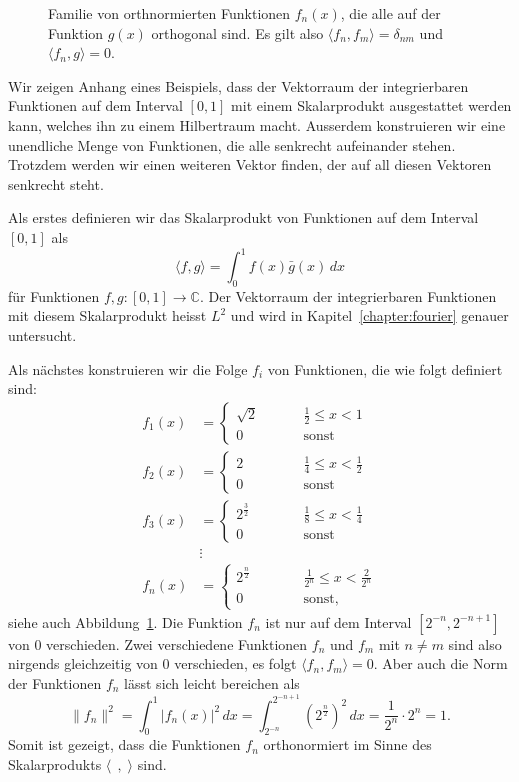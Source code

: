 \begin{beispiel}
\begin{figure}
\caption{Familie von orthnormierten Funktionen $f_n(x)$, die alle auf der
Funktion $g(x)$ orthogonal sind.
Es gilt also $\langle f_n,f_m\rangle = \delta_{nm}$ und
$\langle f_n,g\rangle=0$.
\label{l2orth}}
\end{figure}
Wir zeigen Anhang eines Beispiels, dass der Vektorraum  der integrierbaren
Funktionen auf dem Interval $[0,1]$ mit einem Skalarprodukt
ausgestattet werden kann, welches ihn zu einem Hilbertraum macht.
Ausserdem konstruieren wir eine unendliche Menge von Funktionen, die alle
senkrecht aufeinander stehen.
Trotzdem werden wir einen weiteren Vektor finden, der auf all diesen
Vektoren senkrecht steht.

Als erstes definieren wir das Skalarprodukt von Funktionen auf dem
Interval $[0,1]$ als
\[
\langle f, g\rangle
=
\int_0^1 f(x) \bar{g}(x)\,dx
\]
für Funktionen $f,g\colon [0,1]\to\mathbb C$.
Der Vektorraum der integrierbaren Funktionen mit diesem Skalarprodukt
heisst $L^2$ und wird in Kapitel~\ref{chapter:fourier} genauer untersucht.

Als nächstes konstruieren wir die Folge $f_i$ von Funktionen, die wie
folgt definiert sind:
\begin{align*}
f_1(x) &= \begin{cases}
\sqrt{2}&\qquad \frac12 \le x < 1\\
0\phantom{000}&\qquad\text{sonst}
\end{cases}
\\
f_2(x) &= \begin{cases}
2&\qquad \frac14 \le x < \frac12\\
0\phantom{000}&\qquad\text{sonst}
\end{cases}
\\
f_3(x) &= \begin{cases}
2^{\frac32}&\qquad \frac18 \le x < \frac14\\
0\phantom{000}&\qquad\text{sonst}
\end{cases}
\\
&\vdots
\\
f_n(x) &= \begin{cases}
2^{\frac{n}2}&\qquad \frac1{2^n} \le x < \frac2{2^n}\\
0\phantom{000}&\qquad\text{sonst,}
\end{cases}
\end{align*}
siehe auch Abbildung~\ref{l2orth}.
Die Funktion $f_n$ ist nur auf dem Interval $[2^{-n},2^{-n+1}]$ von
$0$ verschieden.
Zwei verschiedene Funktionen $f_n$ und $f_m$ mit $n\ne m$ sind also
nirgends gleichzeitig von $0$ verschieden, es folgt
$\langle f_n,f_m\rangle =0$.
Aber auch die Norm der Funktionen $f_n$ lässt sich leicht bereichen
als
\[
\|f_n\|^2
=
\int_0^1 |f_n(x)|^2\,dx
=
\int_{2^{-n}}^{2^{-n+1}} (2^{\frac{n}2})^2 \,dx
=
\frac1{2^n}\cdot 2^n = 1.
\]
Somit ist gezeigt, dass die Funktionen $f_n$ orthonormiert im Sinne des
Skalarprodukts $\langle\;\,,\;\rangle$ sind.


\end{beispiel}

